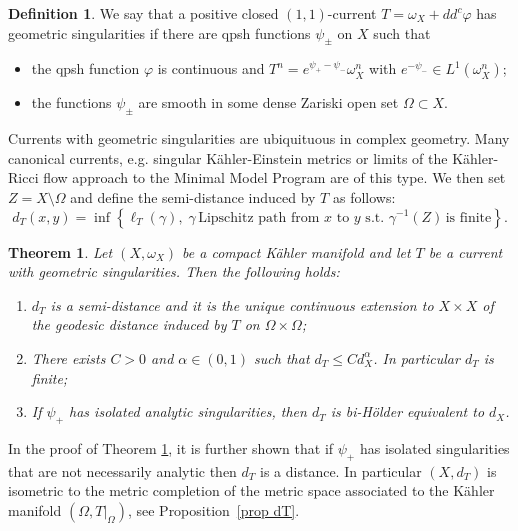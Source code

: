 \documentclass[a4paper,11pt,leqno,english]{smfart}
\theoremstyle{plain}
\theoremstyle{plain}
\newtheorem{bigthm}{Theorem}
\numberwithin{equation}{section} %
\numberwithin{figure}{section} %
\theoremstyle{plain}
\theoremstyle{plain}
\theoremstyle{remark}
\theoremstyle{remark}
\theoremstyle{definition}
\theoremstyle{plain}
\theoremstyle{plain}
\theoremstyle{definition}
\newtheorem{defi}[thm]{Definition}
\newcommand{\f}{\varphi}
\newcommand{\p}{\psi}
\renewcommand{\le}{\leq}
\begin{document}
\begin{defi} 
\label{def:geomsing}
We say that a positive closed $(1,1)$-current $T=\omega_X+dd^c \f$ has geometric singularities if
there are qpsh functions $\p_{\pm}$ on $X$
such that
\begin{itemize}
\item[$\bullet$] the qpsh function $\f$ is continuous and $T^n=e^{\p_+-\p_-} \omega_X^n$ with $e^{-\p_-} \in L^1(\omega_X^n)$;  
\item[$\bullet$] the functions $\p_{\pm}$ are smooth in some dense Zariski open set $\Omega\subset X$.
\end{itemize}
\end{defi}

Currents with geometric singularities are ubiquituous in complex geometry. Many canonical currents,
e.g. singular K\"ahler-Einstein metrics \cite{EGZ09} or 
limits  of the K\"ahler-Ricci flow approach to the Minimal Model Program \cite{ST09}
are of this type. 
 We then set $Z =X \setminus \Omega$ and define the semi-distance induced by $T$ 
 as follows: 
 $$
d_{T}(x,y)=\inf \left\{ \ell_{T}(\gamma), \; 
\gamma\, \text{Lipschitz path from } x \text{ to } y \,\, \mbox{s.t.} \, \,\gamma^{-1}(Z) \, \mbox{is finite} \right\}.
$$


     \begin{bigthm} \label{thmE}
     Let $(X,\omega_X)$ be a compact K\"ahler manifold and let $T$ be a current
with geometric singularities. Then the following holds:
\begin{enumerate}[label=$(\roman*)$]
\item $d_T$ is a semi-distance and it is the unique continuous extension to $X\times X$ of the geodesic distance
induced by $T$ on $\Omega\times\Omega$;
\item There exists $C>0$ and $\alpha\in(0,1)$ such that $d_{T} \le C d_X^\alpha$. In particular $d_{T}$ is finite;  
\item If $\psi_+$ has isolated analytic singularities, then $d_T$ is bi-Hölder equivalent to $d_X$.
\end{enumerate}
\end{bigthm} 

In the proof of Theorem \ref{thmE}, it is further shown that if $\psi_+$ has isolated singularities that are not necessarily analytic then $d_{T}$ is a distance. In particular $(X,d_T)$ is isometric to the metric completion of the metric space associated to the Kähler manifold $(\Omega, T|_\Omega)$,  see Proposition~\ref{prop dT}.
\end{document}
